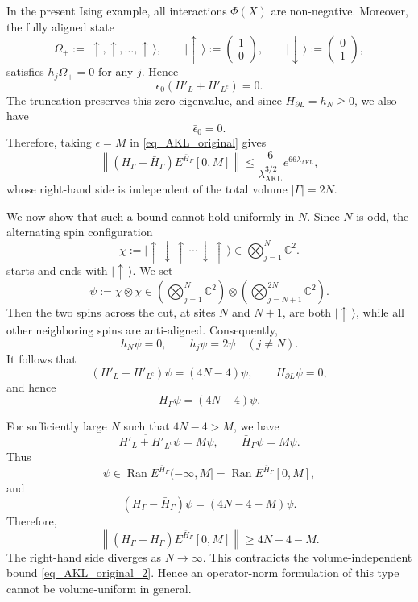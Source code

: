 \documentclass[11pt]{article}
\numberwithin{equation}{section}
\begin{document}
In the present Ising example, all interactions $\Phi(X)$ are non-negative. Moreover, the fully aligned state
\[
\Omega_+:=|\uparrow,\uparrow,\ldots,\uparrow\,\rangle,\qquad
|\uparrow\,\rangle:=
\begin{pmatrix}
1\\
0
\end{pmatrix},
\qquad
|\downarrow\,\rangle:=
\begin{pmatrix}
0\\
1
\end{pmatrix},
\]
satisfies $h_j\Omega_+=0$ for any $j$. Hence
\[
\epsilon_0(H'_L+H'_{L^c})=0.
\]
The truncation preserves this zero eigenvalue, and since $H_{\partial L}=h_N\geq0$, we also have
\[
\bar{\epsilon}_0=0.
\]
Therefore, taking $\epsilon=M$ in \eqref{eq_AKL_original} gives
\begin{equation}\label{eq_AKL_original_2}
\left\|(H_\Gamma-\bar{H}_\Gamma) E^{\bar{H}_\Gamma}[0,M]\right\|
\leq\frac{6}{\lambda_{\mathrm{AKL}}^{3/2}} e^{66\lambda_{\mathrm{AKL}}},
\end{equation}
whose right-hand side is independent of the total volume $|\Gamma|=2N$.

\medskip
We now show that such a bound cannot hold uniformly in $N$. Since $N$ is odd, the alternating spin configuration
\[
\chi:=|\uparrow\,\downarrow\,\uparrow\,\cdots\,\downarrow\,\uparrow\,\rangle\in \bigotimes_{j=1}^{N}\mathbb{C}^2.
\]
starts and ends with $|\uparrow\,\rangle$. We set
\[
\psi:=\chi\otimes\chi\in \left(\bigotimes_{j=1}^{N}\mathbb{C}^2\right) \otimes \left(\bigotimes_{j=N+1}^{2N}\mathbb{C}^2\right).
\]
Then the two spins across the cut, at sites $N$ and $N+1$, are both $|\uparrow\,\rangle$, while all other neighboring spins are anti-aligned. Consequently,
\[
h_N\psi=0,\qquad
h_j\psi=2\psi\quad (j\neq N).
\]
It follows that
\[
(H'_L+H'_{L^c})\psi=(4N-4)\psi,\qquad
H_{\partial L}\psi=0,
\]
and hence
\[
H_\Gamma\psi=(4N-4)\psi.
\]

For sufficiently large $N$ such that $4N-4>M$, we have
\[
\overline{H'_L+H'_{L^c}}\psi=M\psi,\qquad
\bar{H}_\Gamma\psi=M\psi.
\]
Thus
\[
\psi\in\operatorname{Ran}E^{\bar{H}_\Gamma}(-\infty,M]=\operatorname{Ran}E^{\bar{H}_\Gamma}[0,M],
\]
and
\[
(H_\Gamma-\bar{H}_\Gamma)\psi=(4N-4-M)\psi.
\]
Therefore,
\[
\left\|(H_\Gamma-\bar{H}_\Gamma) E^{\bar{H}_\Gamma}[0,M]\right\|\geq4N-4-M.
\]
The right-hand side diverges as $N\to\infty$. This contradicts the volume-independent bound \eqref{eq_AKL_original_2}. Hence an operator-norm formulation of this type cannot be volume-uniform in general.
\end{document}
